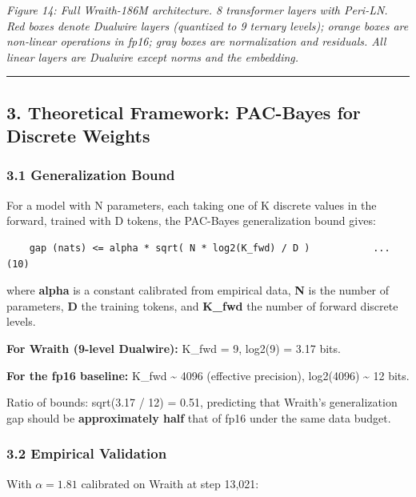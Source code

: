 \emph{Figure 14: Full Wraith-186M architecture. 8 transformer layers
with Peri-LN. Red boxes denote Dualwire layers (quantized to 9 ternary
levels); orange boxes are non-linear operations in fp16; gray boxes are
normalization and residuals. All linear layers are Dualwire except norms
and the embedding.}

\begin{center}\rule{0.5\linewidth}{0.5pt}\end{center}

\subsection{3. Theoretical Framework: PAC-Bayes for Discrete
Weights}\label{theoretical-framework-pac-bayes-for-discrete-weights}

\subsubsection{3.1 Generalization Bound}\label{generalization-bound}

For a model with N parameters, each taking one of K discrete values in
the forward, trained with D tokens, the PAC-Bayes generalization bound
gives:

\begin{verbatim}
    gap (nats) <= alpha * sqrt( N * log2(K_fwd) / D )           ... (10)
\end{verbatim}

where \textbf{alpha} is a constant calibrated from empirical data,
\textbf{N} is the number of parameters, \textbf{D} the training tokens,
and \textbf{K\_fwd} the number of forward discrete levels.

\textbf{For Wraith (9-level Dualwire):} K\_fwd = 9, log2(9) = 3.17 bits.

\textbf{For the fp16 baseline:} K\_fwd \textasciitilde{} 4096 (effective
precision), log2(4096) \textasciitilde{} 12 bits.

Ratio of bounds: sqrt(3.17 / 12) = 0.51, predicting that Wraith's
generalization gap should be \textbf{approximately half} that of fp16
under the same data budget.

\subsubsection{3.2 Empirical Validation}\label{empirical-validation}

With \(\alpha = 1.81\) calibrated on Wraith at step 13,021:


